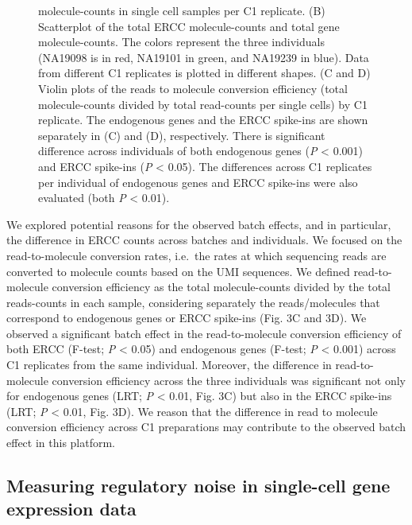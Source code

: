 \begin{figure}[htbp]
{molecule-counts in single cell samples per C1 replicate. (B) Scatterplot
of the total ERCC molecule-counts and total gene molecule-counts. The
colors represent the three individuals (NA19098 is in red, NA19101 in
green, and NA19239 in blue). Data from different C1 replicates is
plotted in different shapes. (C and D) Violin plots of the reads to
molecule conversion efficiency (total molecule-counts divided by total
read-counts per single cells) by C1 replicate. The endogenous genes and
the ERCC spike-ins are shown separately in (C) and (D), respectively.
There is significant difference across individuals of both endogenous
genes (\emph{P} \textless{} 0.001) and ERCC spike-ins (\emph{P}
\textless{} 0.05). The differences across C1 replicates per individual
of endogenous genes and ERCC spike-ins were also evaluated (both
\emph{P} \textless{} 0.01).}
\end{figure}

We explored potential reasons for the observed batch effects, and in
particular, the difference in ERCC counts across batches and
individuals. We focused on the read-to-molecule conversion rates,
i.e.~the rates at which sequencing reads are converted to molecule
counts based on the UMI sequences. We defined read-to-molecule
conversion efficiency as the total molecule-counts divided by the total
reads-counts in each sample, considering separately the reads/molecules
that correspond to endogenous genes or ERCC spike-ins (Fig. 3C and 3D).
We observed a significant batch effect in the read-to-molecule
conversion efficiency of both ERCC (F-test; \emph{P} \textless{} 0.05)
and endogenous genes (F-test; \emph{P} \textless{} 0.001) across C1
replicates from the same individual. Moreover, the difference in
read-to-molecule conversion efficiency across the three individuals was
significant not only for endogenous genes (LRT; \emph{P} \textless{}
0.01, Fig. 3C) but also in the ERCC spike-ins (LRT; \emph{P} \textless{}
0.01, Fig. 3D). We reason that the difference in read to molecule
conversion efficiency across C1 preparations may contribute to the
observed batch effect in this platform.

\subsection{Measuring regulatory noise in single-cell gene expression
data}\label{measuring-regulatory-noise-in-single-cell-gene-expression-data}

